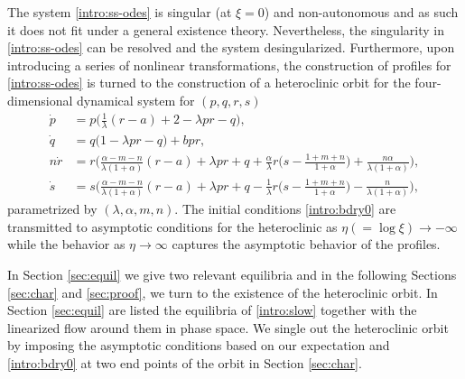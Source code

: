 \documentclass[a4paper,11pt]{article}
\theoremstyle{remark}
\begin{document}
The system \eqref{intro:ss-odes} is singular (at $\xi=0$) and non-autonomous and as such it does not fit under a general existence theory.
Nevertheless,  the singularity in \eqref{intro:ss-odes} can be resolved and the system desingularized. Furthermore, upon introducing a series of nonlinear transformations,  the construction of profiles for \eqref{intro:ss-odes} is turned to the
construction of a heteroclinic orbit for the four-dimensional dynamical system for $(p,q,r,s)$ 
\begin{equation}\label{intro:slow}\tag{S}
 \begin{aligned}
 \dot{p} &=p\Big(\frac{1}{\lambda}(r-a) + 2- \lambda p r -q\Big), \\
 \dot{q} &=q\Big(1 -\lambda p r -q\Big) + b p r,\\
 n\dot{r} &=r\Big(\frac{\alpha-m-n}{\lambda(1+\alpha)}(r-a) + \lambda pr + q +\frac{\alpha}{\lambda}r\big(s- \frac{1+m+n}{1+\alpha}\big) + \frac{n\alpha}{\lambda(1+\alpha)}\Big),\\
 \dot{s} &=s\Big(\frac{\alpha-m-n}{\lambda(1+\alpha)}(r-a) + \lambda pr + q - \frac{1}{\lambda}r\big(s- \frac{1+m+n}{1+\alpha}\big) - \frac{n}{\lambda(1+\alpha)}\Big),
 \end{aligned}
\end{equation}
parametrized by $(\lambda,\alpha,m,n)$. The initial conditions \eqref{intro:bdry0} are transmitted to asymptotic conditions for the heteroclinic
as $\eta(=\log\xi) \to -\infty$ while the behavior as $\eta \to \infty$ captures the asymptotic behavior of the profiles.


In Section \ref{sec:equil} we give two relevant equilibria and in the following Sections \ref{sec:char} and \ref{sec:proof}, we turn to the existence of the heteroclinic orbit. In Section  \ref{sec:equil} are listed
the equilibria of  \eqref{intro:slow} together with the linearized flow around them in phase space. We single out the heteroclinic orbit by imposing the asymptotic conditions based on our expectation and \eqref{intro:bdry0} at two end points of the orbit in Section \ref{sec:char}.
\end{document}
